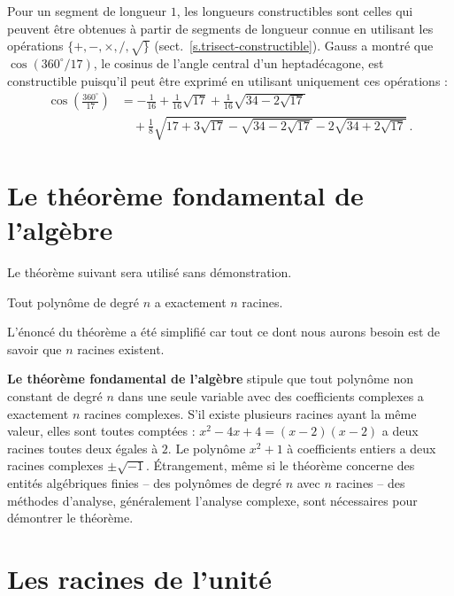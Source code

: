 Pour un segment de longueur $1$, les longueurs constructibles sont celles qui peuvent être obtenues à partir de segments de longueur connue en utilisant les opérations $\{+,-,\times,/,\surd\}$ (sect.~\ref{s.trisect-constructible}). Gauss a montré que $\cos(360^\circ/17)$, le cosinus de l'angle central d'un heptadécagone, est constructible puisqu'il peut être exprimé en utilisant uniquement ces opérations :
\begin{align*}
\cos\left(\frac{360^\circ}{17}\right) &= 
-\frac{1}{16}+\frac{1}{16}\sqrt{17} + 
     \frac{1}{16}\sqrt{34-2\sqrt{17}}
     \\
    &\quad
     +\frac{1}{8}\sqrt{
     17+3\sqrt{17} - 
     \sqrt{34-2\sqrt{17}}
   -2
     \sqrt{34+2\sqrt{17}}
   }\,.
\end{align*}

\section{Le théorème fondamental de l'algèbre}\label{s.fundamental}

Le théorème suivant sera utilisé sans démonstration.

\begin{theorem}\label{thm.fundamental} Tout polynôme de degré $n$ a exactement $n$ racines.
\end{theorem}

L'énoncé du théorème a été simplifié car tout ce dont nous aurons besoin est de savoir que $n$ racines existent.

\smallskip

\begin{advanced}
\textbf{Le théorème fondamental de l'algèbre} stipule que tout polynôme non constant de degré $n$ dans une seule variable avec des coefficients complexes a exactement $n$ racines complexes. 
S'il existe plusieurs racines ayant la même valeur, elles sont toutes comptées : $x^2-4x+4=(x-2)(x-2)$ a deux racines toutes deux égales à $2$.
Le polynôme $x^2+1$ à coefficients entiers a deux racines complexes $\pm\sqrt{-1}$.
Étrangement, même si le théorème concerne des entités algébriques finies -- des polynômes de degré $n$ avec $n$ racines -- des méthodes d'analyse, généralement l'analyse complexe, sont nécessaires pour démontrer le théorème.
\end{advanced}

\section{Les racines de l'unité}\label{s.roots}

